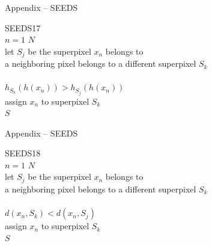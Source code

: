\documentclass[handout]{beamer}
\begin{document}
	\begin{frame}{Appendix -- SEEDS}
		\begin{algo}{SEEDS}{\label{algo:superpixel-segmentation-seeds}}{17}
			\\
			\qfor $n = 1$ \qto $N$\\
				let $S_j$ be the superpixel $x_n$ belongs to\\
				\qif a neighboring pixel belongs to a different superpixel $S_k$\\
					\\
					\qthen\qif $h_{S_k}(h(x_n)) > h_{S_j}(h(x_n))$\\
						\qthen assign $x_n$ to superpixel $S_k$\qfi\qfi\qrof\\
			\qreturn $S$
		\end{algo}
	\end{frame}
	
	\begin{frame}{Appendix -- SEEDS}
		\begin{algo}{SEEDS}{\label{algo:superpixel-segmentation-seeds}}{18}
			\\
			\qfor $n = 1$ \qto $N$\\
				let $S_j$ be the superpixel $x_n$ belongs to\\
				\qif a neighboring pixel belongs to a different superpixel $S_k$\\
					\\
					\qthen\qif $d(x_n, S_k) < d(x_n, S_j)$\\
						\qthen assign $x_n$ to superpixel $S_k$\qfi\qfi\qrof\\
			\qreturn $S$
		\end{algo}
	\end{frame}
	
\end{document}
